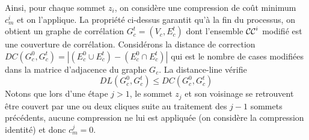 Ainsi, pour chaque sommet $z_i$, on consid\`ere une compression de co\^ut minimum $c_m^i$ et on l'applique.
La propri\'et\'e ci-dessus garantit qu'\`a la fin du processus, on obtient un graphe de corr\'elation $G_c^t = (V_c, E_c^t)$ dont l'ensemble ${\cal CC}^{i}$ modifi\'e est une couverture de corr\'elation.
Consid\'erons la distance de correction $DC(G_c^0, G_c^t ) = | (E_c^0 \cup E_c^t)  - (E_c^0 \cap E_c^t) |$ qui est le nombre de cases modifi\'ees dans la matrice d'adjacence du graphe $G_c$.
La distance-line v\'erifie  
$$DL( G_{c}^{0}, G_{c}^{t}) \le  DC(G_c^0, G_c^t ) $$
Notons que lors d'une \'etape $j > 1$, le sommet $z_j$ et son voisinage se retrouvent \^etre couvert par une ou deux cliques suite au traitement des $j-1$ sommets pr\'ec\'edents, aucune compression ne lui est appliqu\'ee (on consid\`ere la compression identit\'e) et donc 
$c_{m}^{j} = 0$.